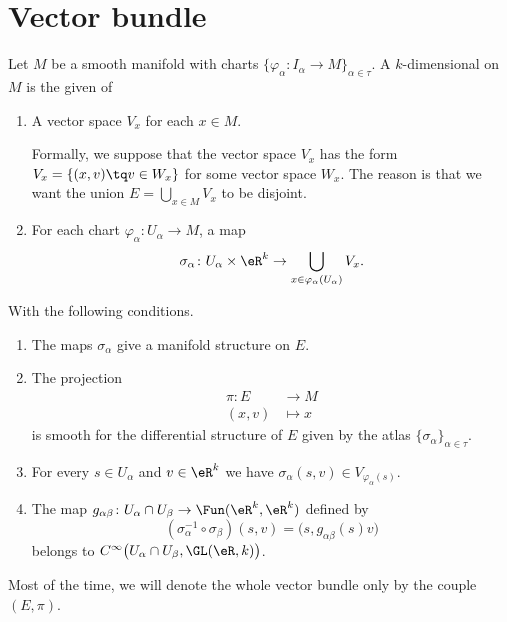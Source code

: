 
\section{Vector bundle}

\begin{definition}		\label{DEFooFRPLooTxMUzg}
	Let \( M\) be a smooth manifold with charts \( \{ \varphi_{\alpha} \colon I_{\alpha}\to M   \}_{\alpha\in \tau}\). A \( k\)-dimensional  on \( M\) is the given of
	\begin{enumerate}
		\item
		      A vector space \( V_x\) for each \( x\in M\).

		      Formally, we suppose that the vector space \( V_x\) has the form \( V_x=\{ (x,v)\tq v\in W_x \}\) for some vector space \( W_x\). The reason is that we want the union \( E=\bigcup_{x\in M}V_x\) to be disjoint.
		\item
		      For each chart \(\varphi_{\alpha} \colon U_{\alpha}\to M  \), a map
		      \begin{equation}
			      \sigma_{\alpha} \colon U_{\alpha}\times \eR^k\to \bigcup_{x\in \varphi_{\alpha}(U_{\alpha})}V_x.
		      \end{equation}
	\end{enumerate}

	With the following conditions.
	\begin{enumerate}[label=(\alph*)]
		\item	\label{ITEMooVIYBooMXFaKb}
		      The maps \( \sigma_{\alpha}\) give a manifold structure on \( E\).
		\item	\label{ITEMooXHOBooERubro}
		      The projection
		      \begin{equation}
			      \begin{aligned}
				      \pi\colon E & \to M     \\
				      (x,v)       & \mapsto x
			      \end{aligned}
		      \end{equation}
		      is smooth for the differential structure of \( E\) given by the atlas \( \{ \sigma_{\alpha} \}_{\alpha\in\tau}\).
		\item		\label{ITEMooXJIVooVJTorK}
		      For every \( s\in U_{\alpha}\) and \( v\in \eR^k\) we have \( \sigma_{\alpha}(s,v)\in V_{\varphi_{\alpha}(s)}\).
		\item		\label{ITEMooPNLXooLQWGqc}
		      The map \(g_{\alpha\beta} \colon U_{\alpha}\cap U_{\beta}\to \Fun(\eR^k,\eR^k)  \) defined by
		      \begin{equation}
			      (\sigma_{\alpha}^{-1}\circ \sigma_{\beta})(s,v)=\big( s,g_{\alpha\beta}(s)v \big)
		      \end{equation}
		      belongs to \( C^{\infty}\big( U_{\alpha}\cap U_{\beta},\GL(\eR,k) \big)\).
	\end{enumerate}
	Most of the time, we will denote the whole vector bundle only by the couple \( (E,\pi)\).


\end{definition}
